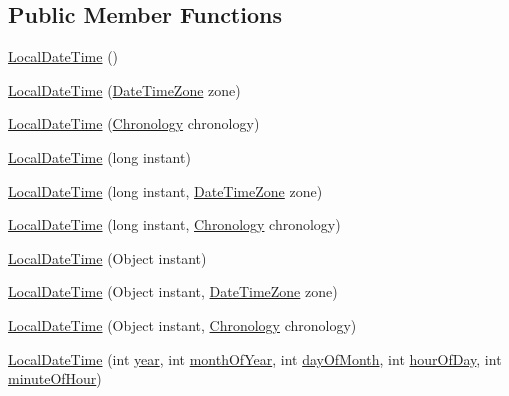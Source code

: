 \subsection*{Public Member Functions}
\begin{DoxyCompactItemize}
\item 
\hyperlink{classorg_1_1joda_1_1time_1_1_local_date_time_aab06f4c9bbf176d8c1308bb8408c18be}{Local\-Date\-Time} ()
\item 
\hyperlink{classorg_1_1joda_1_1time_1_1_local_date_time_abcd915b7a3abb17b876a75b3e28f176a}{Local\-Date\-Time} (\hyperlink{classorg_1_1joda_1_1time_1_1_date_time_zone}{Date\-Time\-Zone} zone)
\item 
\hyperlink{classorg_1_1joda_1_1time_1_1_local_date_time_ac474cbaddbbd28af1f117ef8a8c6ef7c}{Local\-Date\-Time} (\hyperlink{classorg_1_1joda_1_1time_1_1_chronology}{Chronology} chronology)
\item 
\hyperlink{classorg_1_1joda_1_1time_1_1_local_date_time_a0f1aedb9da54cf622d0fd090ac03f925}{Local\-Date\-Time} (long instant)
\item 
\hyperlink{classorg_1_1joda_1_1time_1_1_local_date_time_a981125bb3e271d275969887e57c18439}{Local\-Date\-Time} (long instant, \hyperlink{classorg_1_1joda_1_1time_1_1_date_time_zone}{Date\-Time\-Zone} zone)
\item 
\hyperlink{classorg_1_1joda_1_1time_1_1_local_date_time_ad08c90277451264a96799056a3e903ce}{Local\-Date\-Time} (long instant, \hyperlink{classorg_1_1joda_1_1time_1_1_chronology}{Chronology} chronology)
\item 
\hyperlink{classorg_1_1joda_1_1time_1_1_local_date_time_a70325cb8f4d92f5ae5bcff8533d77eb0}{Local\-Date\-Time} (Object instant)
\item 
\hyperlink{classorg_1_1joda_1_1time_1_1_local_date_time_a7c2d6a4a71dd1d6fa84f1cb5a3ac5fcc}{Local\-Date\-Time} (Object instant, \hyperlink{classorg_1_1joda_1_1time_1_1_date_time_zone}{Date\-Time\-Zone} zone)
\item 
\hyperlink{classorg_1_1joda_1_1time_1_1_local_date_time_ac87f1c10faa758533530726787352e9b}{Local\-Date\-Time} (Object instant, \hyperlink{classorg_1_1joda_1_1time_1_1_chronology}{Chronology} chronology)
\item 
\hyperlink{classorg_1_1joda_1_1time_1_1_local_date_time_aacc7d8e81ec74c640c9a11bc9e3e6ab8}{Local\-Date\-Time} (int \hyperlink{classorg_1_1joda_1_1time_1_1_local_date_time_a204e5baf4064e68f6643ddc2e5bb5218}{year}, int \hyperlink{classorg_1_1joda_1_1time_1_1_local_date_time_aa150366f50fde648fce8197873491938}{month\-Of\-Year}, int \hyperlink{classorg_1_1joda_1_1time_1_1_local_date_time_abcc5d49a5abca169b71d2a61697ffa47}{day\-Of\-Month}, int \hyperlink{classorg_1_1joda_1_1time_1_1_local_date_time_a0cef0e3789bc2a1b01172b7247687127}{hour\-Of\-Day}, int \hyperlink{classorg_1_1joda_1_1time_1_1_local_date_time_a6c4f0b7bf43fcef44770d5fe74a7a2eb}{minute\-Of\-Hour})

\end{DoxyCompactItemize}
